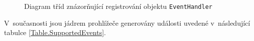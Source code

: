 \begin{figure}[H]
  \begin{center}
    \caption{Diagram tříd znázorňující registrování objektu \texttt{EventHandler}}
    \label{Figure.EventHandlerEventListener}
  \end{center}
\end{figure}

\vspace{-1em}

\noindent V~současnosti jsou jádrem prohlížeče generovány události uvedené v~následující tabulce \ref{Table.SupportedEvents}.

\smallskip

